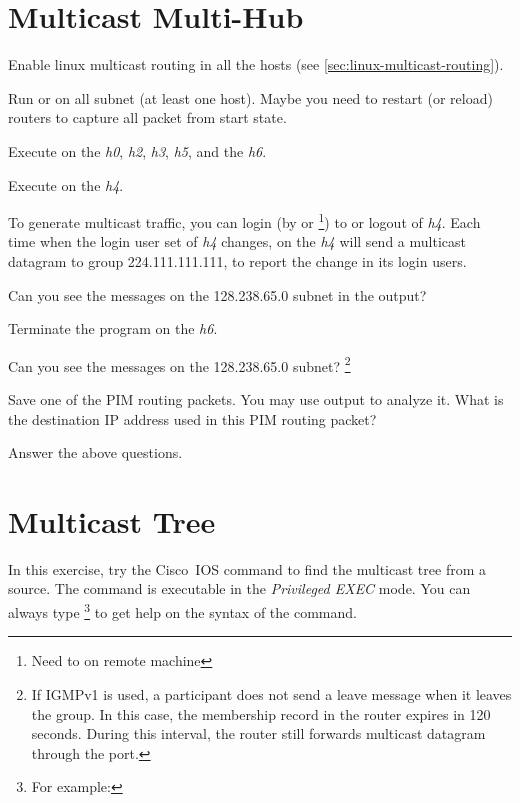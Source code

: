 \documentclass{../UTNetLab}
\begin{document}
\section{Multicast Multi-Hub}
Enable linux multicast routing in all the hosts (see \autoref{sec:linux-multicast-routing}).

Run  or  on all subnet (at least one host).
Maybe you need to restart (or reload) routers to capture all packet from start state.

Execute  on the \textit{h0}, \textit{h2}, \textit{h3}, \textit{h5}, and the \textit{h6}.

Execute  on the \textit{h4}.

To generate multicast traffic, you can login (by  or \footnote{Need to  on remote machine}) to or logout of \textit{h4}.
Each time when the login user set of \textit{h4} changes,  on the \textit{h4} will send a multicast datagram to group 224.111.111.111, to report the change in its login users.

Can you see the  messages on the 128.238.65.0 subnet in the  output?

Terminate the  program on the \textit{h6}.

Can you see the  messages on the 128.238.65.0 subnet?
\footnote{If IGMPv1 is used, a participant does not send a leave message when it leaves the group.
    In this case, the membership record in the router expires in 120 seconds.
    During this interval, the router still forwards multicast datagram through the port.}

Save one of the PIM routing packets.
You may use  output to analyze it.
What is the destination IP address used in this PIM routing packet?

\begin{report}
    \item Answer the above questions.
\end{report}

\section{Multicast Tree}
In this exercise, try the  Cisco~IOS command to find the multicast tree from a source.
The  command is executable in the \textit{Privileged EXEC} mode.
You can always type \footnote{For example: } to get help on the syntax of the command.
\end{document}

